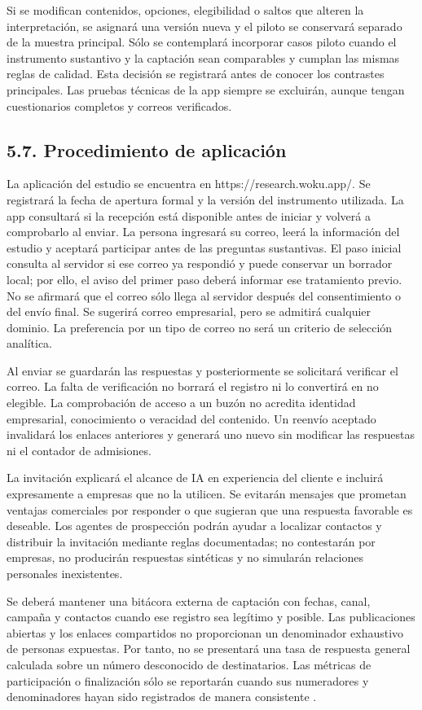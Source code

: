 \documentclass[12pt,letterpaper]{article}
\begin{document}
Si se modifican contenidos, opciones, elegibilidad o saltos que alteren la interpretación, se asignará una versión nueva y el piloto se conservará separado de la muestra principal. Sólo se contemplará incorporar casos piloto cuando el instrumento sustantivo y la captación sean comparables y cumplan las mismas reglas de calidad. Esta decisión se registrará antes de conocer los contrastes principales. Las pruebas técnicas de la app siempre se excluirán, aunque tengan cuestionarios completos y correos verificados.

\subsection*{5.7. Procedimiento de aplicación}
La aplicación del estudio se encuentra en https://research.woku.app/. Se registrará la fecha de apertura formal y la versión del instrumento utilizada. La app consultará si la recepción está disponible antes de iniciar y volverá a comprobarlo al enviar. La persona ingresará su correo, leerá la información del estudio y aceptará participar antes de las preguntas sustantivas. El paso inicial consulta al servidor si ese correo ya respondió y puede conservar un borrador local; por ello, el aviso del primer paso deberá informar ese tratamiento previo. No se afirmará que el correo sólo llega al servidor después del consentimiento o del envío final. Se sugerirá correo empresarial, pero se admitirá cualquier dominio. La preferencia por un tipo de correo no será un criterio de selección analítica.

Al enviar se guardarán las respuestas y posteriormente se solicitará verificar el correo. La falta de verificación no borrará el registro ni lo convertirá en no elegible. La comprobación de acceso a un buzón no acredita identidad empresarial, conocimiento o veracidad del contenido. Un reenvío aceptado invalidará los enlaces anteriores y generará uno nuevo sin modificar las respuestas ni el contador de admisiones.

La invitación explicará el alcance de IA en experiencia del cliente e incluirá expresamente a empresas que no la utilicen. Se evitarán mensajes que prometan ventajas comerciales por responder o que sugieran que una respuesta favorable es deseable. Los agentes de prospección podrán ayudar a localizar contactos y distribuir la invitación mediante reglas documentadas; no contestarán por empresas, no producirán respuestas sintéticas y no simularán relaciones personales inexistentes.

Se deberá mantener una bitácora externa de captación con fechas, canal, campaña y contactos cuando ese registro sea legítimo y posible. Las publicaciones abiertas y los enlaces compartidos no proporcionan un denominador exhaustivo de personas expuestas. Por tanto, no se presentará una tasa de respuesta general calculada sobre un número desconocido de destinatarios. Las métricas de participación o finalización sólo se reportarán cuando sus numeradores y denominadores hayan sido registrados de manera consistente \citep{eysenbach}.
\end{document}
